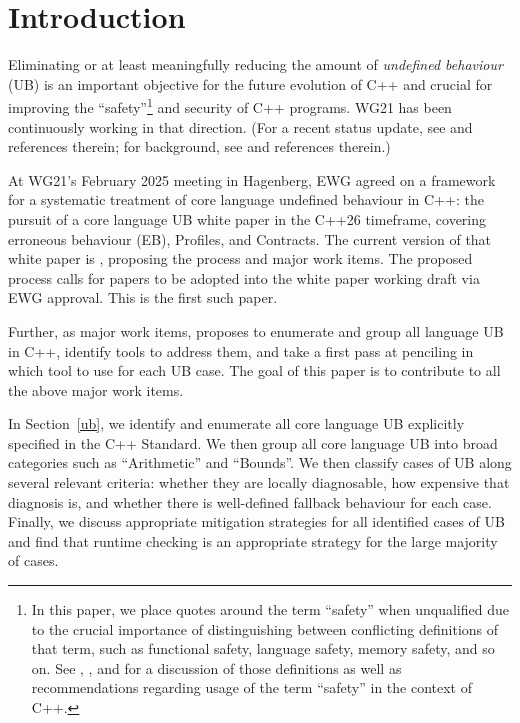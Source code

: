 



\section{Introduction}
\label{intro}

Eliminating or at least meaningfully reducing the amount of \emph{undefined behaviour} (UB) is an important objective for the future evolution of C++ and crucial for improving the ``safety''\footnote{In this paper, we place quotes around the term ``safety'' when unqualified due to the crucial importance of distinguishing between  conflicting definitions of that term, such as functional safety, language safety, memory safety, and so on.  See \cite{P3376R0}, \cite{P3500R1}, and \cite{P3578R0} for a discussion of those definitions as well as recommendations regarding usage of the term ``safety'' in the context of C++.}
and security of C++ programs. WG21 has been continuously working in that direction. (For a recent status update, see \cite{Sutter2025} and references therein; for background, see \cite{Sutter2024} and references therein.)

At WG21's February 2025 meeting in Hagenberg, EWG agreed on a framework for a systematic
treatment of core language undefined behaviour in C++: the pursuit of a core language UB white paper in the C++26 timeframe, covering erroneous behaviour (EB), Profiles, and Contracts. The current version of that white paper is \cite{P3656R1}, proposing the process and major work items. The proposed process calls for papers to be adopted into the white paper working draft via EWG approval. This is the first such paper.

Further, as major work items, \cite{P3656R1} proposes to enumerate and group all language UB in C++, identify tools to address them, and take a first pass at penciling in which tool to use for each UB case. The goal of this paper is to contribute to all the above major work items.

In Section~\ref{ub}, we identify and enumerate all core language UB explicitly specified in the C++ Standard. We then group all core language UB into broad categories such as ``Arithmetic'' and ``Bounds''. We then classify cases of UB along several relevant criteria: whether they are locally diagnosable, how expensive that diagnosis is, and whether there is well-defined fallback behaviour for each case. Finally, we discuss appropriate mitigation strategies for all identified cases of UB and find that runtime checking is an appropriate strategy for the large majority of cases.

